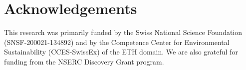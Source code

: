 \section{Acknowledgements}
%
This research was primarily funded by the Swiss National Science Foundation (SNSF-200021-134892) and by the Competence Center for Environmental Sustainability (CCES-SwissEx) of the ETH domain. We are also grateful for funding from the NSERC Discovery Grant program.



%


